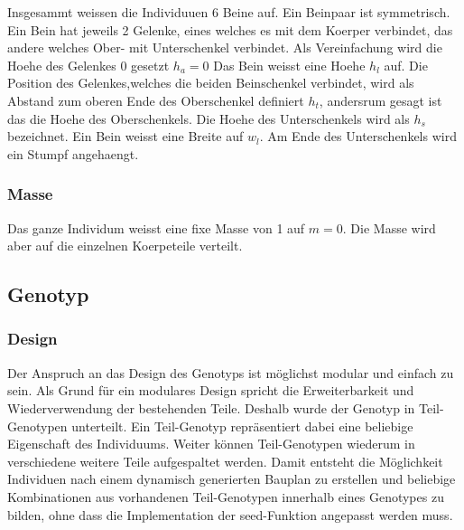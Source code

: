      Insgesammt weissen die Individuuen 6 Beine auf. Ein Beinpaar ist symmetrisch. Ein Bein hat jeweils 2 Gelenke,
      eines welches es mit dem Koerper verbindet,
      das andere welches Ober- mit Unterschenkel verbindet.
      Als Vereinfachung wird die Hoehe des Gelenkes 0 gesetzt  \(h_{a} = 0\)
      Das Bein weisst eine Hoehe \(h_{l}\) auf. Die Position des Gelenkes,welches die beiden Beinschenkel verbindet,
      wird als Abstand zum oberen Ende des Oberschenkel definiert \(h_{t}\),
      andersrum gesagt ist das die Hoehe des Oberschenkels.
      Die Hoehe des Unterschenkels wird als \(h_{s}\) bezeichnet.
      Ein Bein weisst eine Breite auf \(w_{l}\). Am Ende des Unterschenkels wird ein Stumpf angehaengt.

      \subsubsection{Masse\label{subs:Masse}}

        Das ganze Individum weisst eine fixe Masse von 1 auf \(m = 0\).
        Die Masse wird aber auf die einzelnen Koerpeteile verteilt.
        \\
        

    \subsection{Genotyp\label{sub:Genotype}}


      \subsubsection{Design\label{subsub:GenotypeDesign}}

        Der Anspruch an das Design des Genotyps ist möglichst modular und einfach zu sein.
        Als Grund für ein modulares Design spricht die Erweiterbarkeit und Wiederverwendung der bestehenden Teile.
        Deshalb wurde der Genotyp in Teil-Genotypen unterteilt.
        Ein Teil-Genotyp repräsentiert dabei eine beliebige Eigenschaft des Individuums.
        Weiter können Teil-Genotypen wiederum in verschiedene weitere Teile aufgespaltet werden.
        Damit entsteht die Möglichkeit Individuen nach einem dynamisch generierten Bauplan zu erstellen
        und beliebige Kombinationen aus vorhandenen Teil-Genotypen innerhalb eines Genotypes zu bilden,
        ohne dass die Implementation der seed-Funktion angepasst werden muss.

